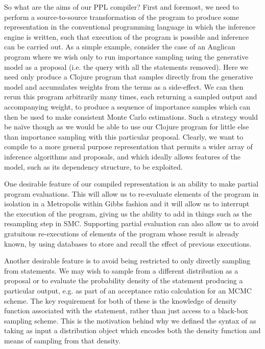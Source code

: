 So what are the aims of our PPL compiler?  First and foremost, we need to
perform a source-to-source transformation of the program to
produce some representation in the conventional programming language in which
the inference engine is written, such that execution of the program is possible and inference
can be carried out.  As a simple example, consider the case of an Anglican program where
we wish only to run importance sampling using the generative model as a proposal 
(i.e. the query with all the \observe statements removed).  Here we need only produce a Clojure program
that samples directly from the generative model and accumulates weights from the
\observe terms as a side-effect.  We can then rerun this program arbitrarily many
times, each returning a sampled output and accompanying weight, to produce a sequence
of importance samples which can then be used to make consistent Monte Carlo estimations.
Such a strategy would be na\"{i}ve though as we would be able to use our Clojure program
for little else than importance sampling with this particular proposal.  Clearly, we want
to compile to a more general purpose representation that permits a wider array of inference algorithms
and proposals, and which ideally allows features of the model, such as its dependency
structure, to be exploited.

One desirable feature of our compiled representation is an ability to make partial
program evaluations.  This will allow us to re-evaluate elements of the program in
isolation in a Metropolis within Gibbs fashion and it will allow us to interrupt the execution
of the program, giving us the ability to add in things such as the resampling step in SMC.
Supporting partial evaluation can also allow us to avoid gratuitous re-executions of
elements of the program whose result is already known, by using databases to store and
recall the effect of previous executions.

Another desirable feature is to avoid being restricted to only directly sampling from \sample
statements.  We may wish to sample from a different distribution as a proposal or to evaluate
the probability density of the \sample statement producing a particular output, e.g. as part
of an acceptance ratio calculation for an MCMC scheme.  The key requirement for both of these
is the knowledge of density function associated with the \sample statement, rather than
just access to a black-box sampling scheme.  This is the motivation behind why we defined
the syntax of \sample as taking as input a distribution object which encodes both the density
function and means of sampling from that density.

